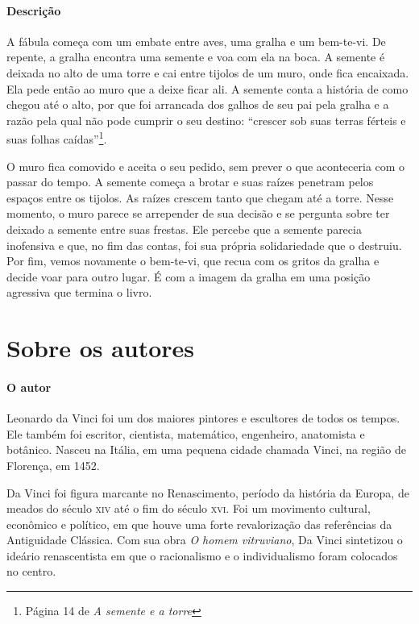 \documentclass[11pt]{extarticle}
\begin{document}
\paragraph{Descrição} A fábula começa com um embate entre aves, uma gralha e um bem-te-vi. De repente, a gralha encontra uma semente e voa com ela na boca. A semente é deixada no alto de uma torre e cai entre tijolos de um muro, onde fica encaixada. Ela pede então ao muro que a deixe ficar ali. A semente conta a história de como chegou até o alto, por que foi arrancada dos galhos de seu pai pela gralha e a razão pela qual não pode cumprir o seu destino: ``crescer sob suas terras férteis e suas folhas caídas''\footnote{Página 14 de \textit{A semente e a torre}}. 

O muro fica comovido e aceita o seu pedido, sem prever o que aconteceria com o passar do tempo. A semente começa a brotar e suas raízes penetram pelos espaços entre os tijolos. As raízes crescem tanto que chegam até a torre. Nesse momento, o muro parece se arrepender de sua decisão e se pergunta sobre ter deixado a semente entre suas frestas. Ele percebe que a semente parecia inofensiva e que, no fim das contas, foi sua própria solidariedade que o destruiu. Por fim, vemos novamente o bem-te-vi, que recua com os gritos da gralha e decide voar para outro lugar. É com a imagem da gralha em uma posição agressiva que termina o livro.

\section{Sobre os autores}


\paragraph{O autor} Leonardo da Vinci foi um dos maiores pintores e escultores de todos os tempos. Ele também foi escritor, cientista, matemático, engenheiro, anatomista e botânico. Nasceu na Itália, em uma pequena cidade chamada Vinci, na região de Florença, em 1452.

Da Vinci foi figura marcante no Renascimento, período da história da Europa, de meados do século \textsc{xiv} até o fim do século  \textsc{xvi}. Foi um movimento cultural, econômico e político, em que houve uma forte revalorização das referências da Antiguidade Clássica. Com sua obra \textit{O homem vitruviano}, Da Vinci sintetizou o ideário renascentista em que o racionalismo e o individualismo foram colocados no centro.
\end{document}
